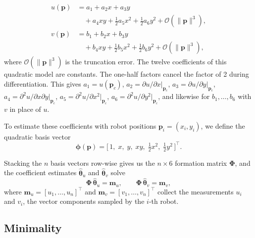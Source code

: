 \documentclass[lettersize,journal]{IEEEtran}
\begin{document}
\begin{align}
    u(\mathbf{p}) &= a_1 + a_2 x + a_3 y
        \nonumber \\
        &\quad + a_4 xy + \tfrac{1}{2} a_5 x^2 + \tfrac{1}{2} a_6 y^2
        + \mathcal{O}(\|\mathbf{p}\|^3),
        \label{eq:quad_model_u} \\
    v(\mathbf{p}) &= b_1 + b_2 x + b_3 y
        \nonumber \\
        &\quad + b_4 xy + \tfrac{1}{2} b_5 x^2 + \tfrac{1}{2} b_6 y^2
        + \mathcal{O}(\|\mathbf{p}\|^3),
        \label{eq:quad_model_v}
\end{align}
where $\mathcal{O}(\|\mathbf{p}\|^3)$ is the truncation error.
The twelve coefficients of this quadratic model are constants. The one-half factors cancel the factor of 2 during differentiation.
This gives $a_1 = u(\mathbf{p}_c)$, $a_2 = \partial u/\partial
x|_{\mathbf{p}_c}$, $a_3 = \partial u/\partial y|_{\mathbf{p}_c}$,
$a_4 = \partial^2 u/\partial x \partial
y|_{\mathbf{p}_c}$, $a_5 = \partial^2 u/\partial x^2|_{\mathbf{p}_c}$,
$a_6 = \partial^2 u/\partial y^2|_{\mathbf{p}_c}$,
and likewise for $b_1, \ldots, b_6$ with $v$ in place of $u$.

To estimate these coefficients with robot positions $\mathbf{p}_i = (x_i,
y_i)$, we define the quadratic basis vector
\begin{equation}
    \boldsymbol{\phi}(\mathbf{p}) =
    \bigl[\,1, \; x, \; y, \; xy, \;
    \tfrac{1}{2}x^2, \; \tfrac{1}{2}y^2\,\bigr]^\top.
\end{equation}



Stacking the $n$ basis vectors row-wise gives us the $n \times 6$ formation matrix $\boldsymbol{\Phi}$, and the coefficient estimates $\hat{\boldsymbol{\theta}}_u$ and $\hat{\boldsymbol{\theta}}_v$ solve
\begin{equation}
\boldsymbol{\Phi}\,\hat{\boldsymbol{\theta}}_u = \mathbf{m}_u, \qquad
\boldsymbol{\Phi}\,\hat{\boldsymbol{\theta}}_v = \mathbf{m}_v,
\label{eq:solve}
\end{equation}
where $\mathbf{m}_u = [u_1, \ldots, u_n]^\top$ and $\mathbf{m}_v = [v_1, \ldots, v_n]^\top$ collect the measurements $u_i$ and $v_i$, 
the vector components sampled by the $i$-th robot.

\subsection{Minimality}
\label{sec:minimality}
\end{document}
